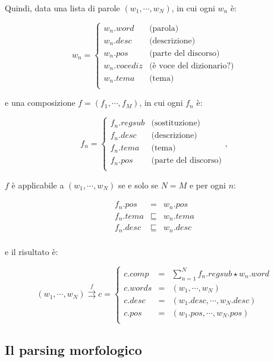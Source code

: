 \documentclass[twoside,stylearticle,11pt,filologia,it,article,bibsection]{spinoza}
\newcommand\spzmcompder{\rightrightarrows}
\newcommand\spzmsussunto{\sqsubseteq}
\newcommand\spzmregsub{\star}
\newcommand\spzmconcat{\sum}
\newenvironment{lingmeq}{\begin{lingeq}\[}{\]\end{lingeq}}
\begin{document}
Quindi, data una lista di parole $(w_1,\cdots,w_N)$, in cui ogni
$w_n$ è:
\begin{lingmeq}
w_n=\left\{\begin{array}{lr}
w_n.{word} & \text{(parola)}\\
w_n.desc & \text{(descrizione)}\\
w_n.{pos} & \text{(parte del discorso)}\\
w_n.vocediz & \text{(è voce del dizionario?)}\\
w_n.tema & \text{(tema)}\\
\end{array}\right.
\end{lingmeq}
\noindent e una composizione $f=(f_1,\cdots,f_M)$, in cui ogni $f_n$ è:
\begin{lingmeq}
f_n=\left\{\begin{array}{lr}
f_n.{regsub} & \text{(sostituzione)}\\
f_n.desc & \text{(descrizione)}\\
f_n.tema & \text{(tema)}\\
f_n.pos & \text{(parte del discorso)}\\
\end{array}\right.,
\end{lingmeq}
\noindent $f$ è applicabile a $(w_1,\cdots,w_N)$ se e solo se $N=M$ e per ogni $n$:
\begin{lingmeq}
\begin{array}{rcl}
f_n.{pos}&=&w_n.{pos}\\
f_n.tema&\spzmsussunto&w_n.tema\\
f_n.{desc}&\spzmsussunto&w_n.desc\\
\end{array}
\end{lingmeq}
\noindent e il risultato è:
\begin{lingmeq}
(w_1,\cdots,w_N) \stackrel{f}{\spzmcompder} c = \left\{
\begin{array}{lll}
c.comp &=& \displaystyle\spzmconcat_{n=1}^{N} f_n.regsub \spzmregsub w_n.word\\
c.words &=& (w_1,\cdots,w_N) \\
c.desc &=& (w_1.desc,\cdots,w_N.desc) \\
c.pos &=& (w_1.pos,\cdots,w_N.pos) \\
\end{array}
\right.
\end{lingmeq}

\subsection{Il parsing morfologico}
\end{document}
